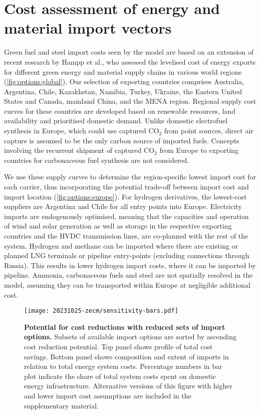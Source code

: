 
\section*{Cost assessment of energy and material import vectors}


Green fuel and steel import costs seen by the model are based on an extension of
recent research by Hampp et al.,\cite{hamppImportOptions2023} who assessed the
levelised cost of energy exports for different green energy and material supply
chains in various world regions (\cref{fig:options:global}). Our selection of
exporting countries comprises Australia, Argentina, Chile, Kazakhstan, Namibia,
Turkey, Ukraine, the Eastern United States and Canada, mainland China, and the
MENA region. Regional supply cost curves for these countries are developed based
on renewable resources, land availability and prioritised domestic demand.
Unlike domestic electrofuel synthesis in Europe, which could use captured CO$_2$
from point sources, direct air capture is assumed to be the only carbon source
of imported fuels. Concepts involving the recurrent shipment of captured CO$_2$
from Europe to exporting countries for carbonaceous fuel synthesis are not
considered.\cite{treeenergysolutionsGreenCycle2024,fonderSyntheticMethaneClosing2024}


We use these supply curves to determine the region-specific lowest import cost
for each carrier, thus incorporating the potential trade-off between import cost
and import location (\cref{fig:options:europe}). For hydrogen derivatives, the
lowest-cost suppliers are Argentina and Chile for all entry points into Europe.
Electricity imports are endogenously optimised, meaning that the capacities and
operation of wind and solar generation as well as storage in the respective
exporting countries and the HVDC transmission lines, are co-planned with the
rest of the system. Hydrogen and methane can be imported where there are
existing or planned LNG terminals or pipeline entry-points (excluding
connections through Russia). This results in lower hydrogen import costs, where
it can be imported by pipeline. Ammonia, carbonaceous fuels and steel are not
spatially resolved in the model, assuming they can be transported within Europe
at negligible additional cost.

\begin{figure*}
    \texttt{[image: 20231025-zecm/sensitivity-bars.pdf]}
    \caption{\textbf{Potential for cost reductions with reduced sets of import options.}
        Subsets of available import options are sorted by ascending cost
        reduction potential. Top panel shows profile of total cost savings.
        Bottom panel shows composition and extent of imports in relation to
        total energy system costs. Percentage numbers in bar plot indicate the
        share of total system costs spent on domestic energy infrastructure.
        Alternative versions of this figure with higher and lower import cost
        assumptions are included in the supplementary material. }
    \label{fig:sensitivity-bars}
\end{figure*}


